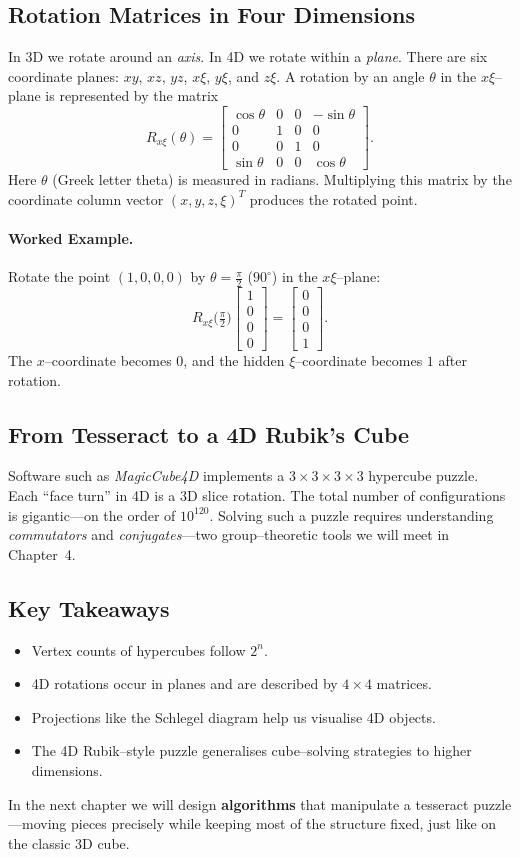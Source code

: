 \documentclass[12pt]{article}
\begin{document}
\subsection*{Rotation Matrices in Four Dimensions}
In 3D we rotate around an \emph{axis}. In 4D we rotate within a \emph{plane}. There are six coordinate planes: $xy$, $xz$, $yz$, $x\xi$, $y\xi$, and $z\xi$.  A rotation by an angle $\theta$ in the $x\xi$–plane is represented by the matrix
\[
R_{x\xi}(\theta)=
\begin{bmatrix}
\cos \theta & 0 & 0 & -\sin \theta\\
0 & 1 & 0 & 0\\
0 & 0 & 1 & 0\\
\sin \theta & 0 & 0 & \cos \theta
\end{bmatrix}.
\]
Here $\theta$ (Greek letter theta) is measured in radians.  Multiplying this matrix by the coordinate column vector $(x, y, z, \xi)^{T}$ produces the rotated point.

\paragraph{Worked Example.} Rotate the point $(1,0,0,0)$ by $\theta=\frac{\pi}{2}$ (\(90^{\circ}\)) in the $x\xi$–plane:
\[
R_{x\xi}\!\bigl(\tfrac{\pi}{2}\bigr)\!
\begin{bmatrix}1\\0\\0\\0\end{bmatrix}
=
\begin{bmatrix}0\\0\\0\\1\end{bmatrix}.
\]
The $x$–coordinate becomes $0$, and the hidden $\xi$–coordinate becomes $1$ after rotation.

\subsection*{From Tesseract to a 4D Rubik’s Cube}
Software such as \emph{MagicCube4D} implements a $3\times3\times3\times3$ hypercube puzzle. Each “face turn” in 4D is a 3D slice rotation.  The total number of configurations is gigantic—on the order of $10^{120}$.  Solving such a puzzle requires understanding \emph{commutators} and \emph{conjugates}—two group–theoretic tools we will meet in Chapter 4.

\subsection*{Key Takeaways}
\begin{itemize}
  \item Vertex counts of hypercubes follow $2^{n}$.
  \item 4D rotations occur in planes and are described by $4\times4$ matrices.
  \item Projections like the Schlegel diagram help us visualise 4D objects.
  \item The 4D Rubik–style puzzle generalises cube–solving strategies to higher dimensions.
\end{itemize}

In the next chapter we will design \textbf{algorithms} that manipulate a tesseract puzzle—moving pieces precisely while keeping most of the structure fixed, just like on the classic 3D cube.
\end{document}
